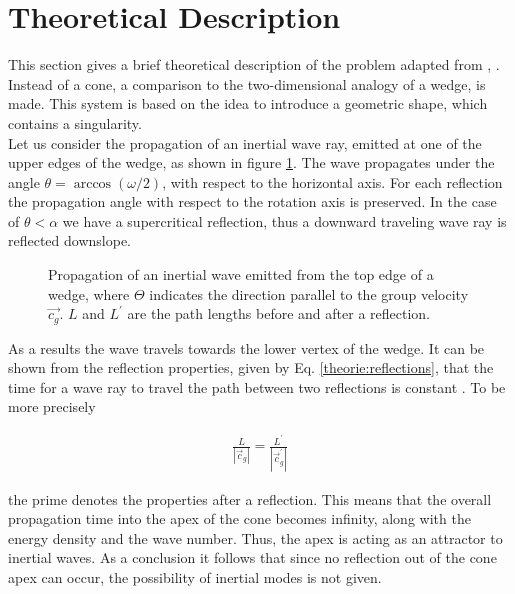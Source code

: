 \section{Theoretical Description}
\label{cone:theorie_theo}

This section gives a brief theoretical description of the problem adapted from \citep{Greenspan1969}, \citep{Beardsley1970}.
Instead of a cone, a comparison to the two-dimensional analogy of a wedge, is made.
This system is based on the idea to introduce a geometric shape, which contains a singularity.\\
Let us consider the propagation of an inertial wave ray, emitted at one of the upper edges of
the wedge, as shown in figure \ref{cone:theorie}.
The wave propagates under the angle $\theta = \arccos(\omega/2)$, with respect to the horizontal axis.
For each reflection the propagation angle with respect to the rotation axis is preserved.
In the case of $\theta<\alpha$ we have a supercritical reflection,
thus a downward traveling wave ray is reflected downslope.

\begin{figure}[!bp]
  \begin{minipage}[c]{0.6\textwidth}
      \centering
  \end{minipage}
  \begin{minipage}[c]{0.3\textwidth}
      \caption{
          Propagation of an inertial wave emitted from the top edge of a wedge,
           where $\Theta$ indicates the direction parallel to the group velocity
            $\vec{c_g}$.  $L$ and $L^{\prime}$ are the path lengths before and after a reflection.
      \label{cone:theorie}
      }
  \end{minipage}
\end{figure}

As a results the wave travels towards the lower vertex of the wedge.
It can be shown from the reflection properties, given by Eq. \ref{theorie:reflections},
that the time for a wave ray to travel the path between two reflections is constant \citep{Beardsley1970}.
To be more precisely

\begin{align}
    \frac{L}{|\vec{c}_g|} = \frac{L^{\prime}}{|\vec{c}_g^{\prime}|}
\end{align}

the prime denotes the properties after a reflection.
This means that the overall propagation time into the apex of the cone becomes infinity, along with the energy density and the wave number.
Thus, the apex is acting as an attractor to inertial waves.
As a conclusion it follows that since no reflection out of the cone apex can occur, the possibility of inertial modes is not given.

